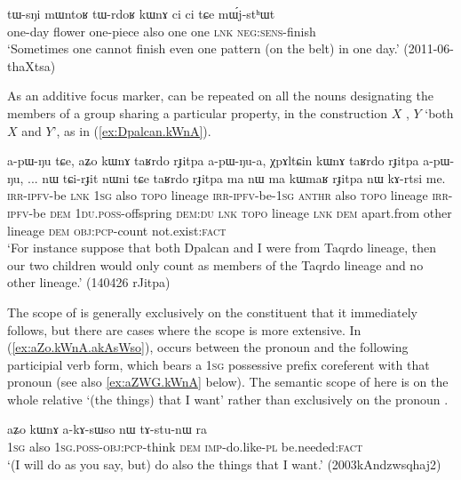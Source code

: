 \begin{exe}
\ex \label{ex:tWrdoR.kWnA}
\gll tɯ-sŋi mɯntoʁ tɯ-rdoʁ kɯnɤ ci ci tɕe mɯ́j-stʰɯt \\
one-day flower one-piece also one one \textsc{lnk} \textsc{neg}:\textsc{sens}-finish \\
\glt `Sometimes one cannot finish even one pattern (on the belt) in one day.' (2011-06-thaXtsa)
\end{exe}

As an additive focus marker,  can be repeated on all the nouns designating the members of a group sharing a particular property, in the construction $X$ , $Y$   `both $X$ and $Y$', as in (\ref{ex:Dpalcan.kWnA}).

\largerpage
\begin{exe}
\ex \label{ex:Dpalcan.kWnA}
 \gll a-pɯ-ŋu tɕe, aʑo kɯnɤ taʁrdo rɟitpa a-pɯ-ŋu-a, χpɤltɕin kɯnɤ taʁrdo rɟitpa a-pɯ-ŋu, ... nɯ tɕi-rɟit nɯni tɕe taʁrdo rɟitpa ma nɯ ma kɯmaʁ rɟitpa nɯ kɤ-rtsi me.  \\
 \textsc{irr}-\textsc{ipfv}-be \textsc{lnk} \textsc{1sg} also  \textsc{topo} lineage  \textsc{irr}-\textsc{ipfv}-be-\textsc{1sg}   \textsc{anthr} also  \textsc{topo} lineage  \textsc{irr}-\textsc{ipfv}-be { } \textsc{dem} \textsc{1du}.\textsc{poss}-offspring \textsc{dem}:\textsc{du} \textsc{lnk}  \textsc{topo} lineage \textsc{lnk} \textsc{dem} apart.from other lineage \textsc{dem} \textsc{obj}:\textsc{pcp}-count not.exist:\textsc{fact} \\
 \glt `For instance suppose that both Dpalcan and I were from Taqrdo lineage, then our two children would only count as members of the Taqrdo lineage and no other lineage.' (140426 rJitpa)
\end{exe}

The scope of   is generally exclusively on the constituent that it immediately follows, but there are cases where the scope is more extensive. In (\ref{ex:aZo.kWnA.akAsWso}),  occurs between the pronoun  and the following participial verb form, which bears a \textsc{1sg} possessive prefix  coreferent with that pronoun (see also \ref{ex:aZWG.kWnA} below). The semantic scope of  here is on the whole relative  `(the things) that I want' rather than exclusively on the pronoun .

\begin{exe}
\ex \label{ex:aZo.kWnA.akAsWso}
 \gll aʑo kɯnɤ a-kɤ-sɯso nɯ tɤ-stu-nɯ ra \\
 \textsc{1sg} also \textsc{1sg}.\textsc{poss}-\textsc{obj}:\textsc{pcp}-think \textsc{dem} \textsc{imp}-do.like-\textsc{pl} be.needed:\textsc{fact} \\
 \glt `(I will do as you say, but) do also the things that I want.' (2003kAndzwsqhaj2)
\end{exe}

